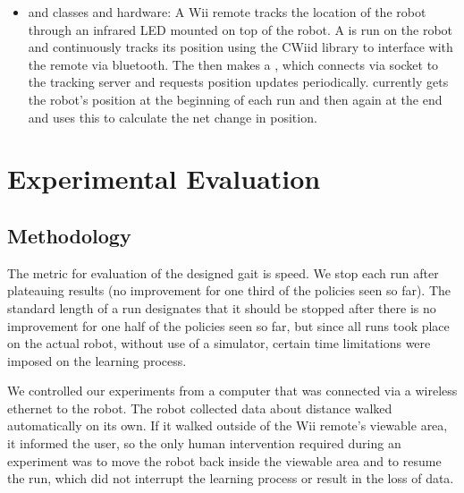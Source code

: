 \begin{itemize}
\item {} and  classes and
  hardware: A Wii remote tracks the location of the robot through an
  infrared LED mounted on top of the robot. A  is
  run on the robot and continuously tracks its position using the
  CWiid library\cite{cwiid} to interface with the remote via
  bluetooth.  The  then makes a
  , which connects via socket to the tracking
  server and requests position updates periodically.
   currently gets the robot's position at the
  beginning of each run and then again at the end and uses this to
  calculate the net change in position.

\end{itemize}



\section{Experimental Evaluation}

\subsection{Methodology}

The metric for evaluation of the designed gait is speed. We stop each 
run after plateauing results (no improvement for one third of the 
policies seen so far). The standard length of a run designates that it
should be stopped after there is no improvement for one half of the policies
seen so far, but since all runs took place on the actual robot, without use
of a simulator, certain time limitations were imposed on the learning process.

We controlled our experiments from a computer that was connected via a
wireless ethernet to the robot. The robot collected data about
distance walked automatically on its own. If it walked outside of the
Wii remote's viewable area, it informed the user, so the only human
intervention required during an experiment was to move the robot back
inside the viewable area and to resume the run, which did not
interrupt the learning process or result in the loss of data.

